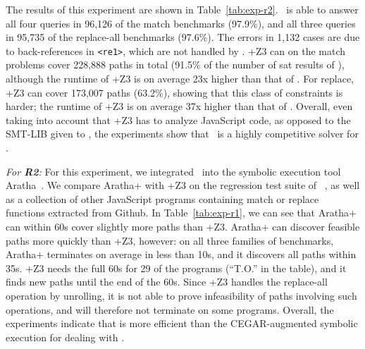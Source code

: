 The results of this experiment are shown in
Table~\ref{tab:exp-r2}. \ostrich\ is able to answer all four queries
in 96,126 of the match benchmarks (97.9\%), and all three queries in
95,735 of the replace-all benchmarks (97.6\%). The errors in 1,132 cases
are due to back-references in \verb!<re1>!, which are not handled by
\ostrich. \expose{}+Z3 can on the match problems cover 228,888 paths in
total (91.5\% of the number of sat results of \ostrich), although the
runtime of \expose{}+Z3 is on average 23x higher than that of
\ostrich. For replace, \expose{}+Z3 can cover 173,007 paths (63.2\%),
showing that this class of constraints is harder; the runtime of
\expose{}+Z3 is on average 37x higher than that of \ostrich.  Overall,
even taking into account that \expose{}+Z3 has to analyze JavaScript
code, as opposed to the SMT-LIB given to \ostrich, the experiments
show that \ostrich\ is a highly competitive solver for \regexps.

\smallskip
{\em For \textbf{R2}:} For this experiment,
we  integrated \ostrich\ into the symbolic
execution tool Aratha~\cite{aratha}.  We compare Aratha+{\ostrich} with
\expose{}+Z3 on the regression test suite of \expose{}~\cite{DBLP:conf/spin/LoringMK17},
as well as a collection of other JavaScript programs containing match or replace
functions extracted from Github. In
Table~\ref{tab:exp-r1}, we can see that Aratha+{\ostrich} can within
60s cover slightly more paths than \expose{}+Z3. Aratha+{\ostrich} can
discover feasible paths more quickly than \expose{}+Z3, however: on
all three families of benchmarks, Aratha+{\ostrich} terminates on
average in less than 10s, and it discovers all paths 
within 35s. \expose{}+Z3 needs the full 60s for
29 of the programs (``T.O.'' in the table),
and it finds new paths until the end of the 60s. Since \expose{}+Z3
handles the replace-all operation by unrolling, it is not able to
prove infeasibility of paths involving such operations, and will
therefore not terminate on some programs.
Overall, the experiments indicate that {\ostrich} is more
efficient than the CEGAR-augmented symbolic execution for dealing
with \regexps.


